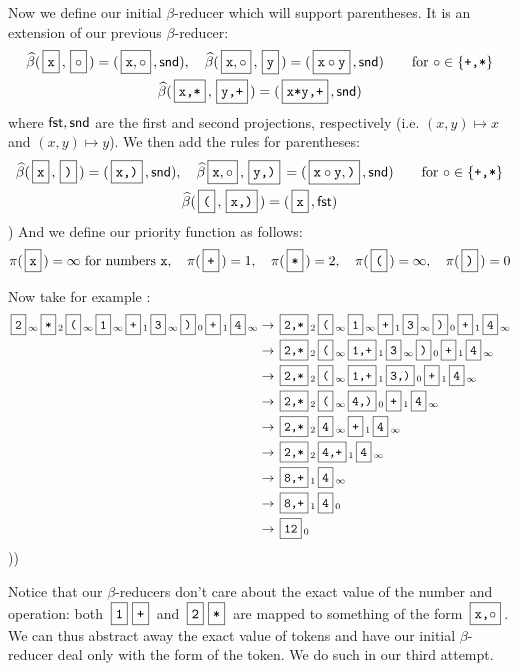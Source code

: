 \documentclass{llncs}
\begin{document}
Now we define our initial $\beta$-reducer which will support parentheses.
It is an extension of our previous $\beta$-reducer:
\begin{gather*}
    \hb(\mbt x,\mb\circ) = (\mb{\ttt x,\circ},\snd),\quad \hb(\mb{\ttt x,\circ},\mbt y) = (\mb{\ttt x\circ\ttt y},\snd) \qquad \hbox{for $\circ\in\set{\ttt{+,*}}$} \\
    \hb(\mbt{x,*},\mbt{y,+}) = (\mbt{x*y,+},\snd)
\end{gather*}
where $\mathsf{fst},\mathsf{snd}$ are the first and second projections, respectively (i.e. $(x,y)\mapsto x$ and $(x,y)\mapsto y$).
We then add the rules for parentheses:
\begin{gather*}
    \hb(\mbt x,\mbt)) = (\mbt{x,)},\snd),\quad \hb{\mb{\ttt x,\circ},\mbt{y,)}} = (\mb{\ttt x\circ\ttt y,\ttt)},\snd) \qquad \hbox{for $\circ\in\set{\ttt{+,*}}$} \\
    \hb(\mbt(,\mbt{x,)}) = (\mbt x,\fst)
\end{gather*}
\gobble) %
And we define our priority function as follows:
\[ \pi(\mbt x) = \infty\hbox{ for numbers \ttt x},\quad \pi(\mbt+) = 1,\quad \pi(\mbt*) = 2,\quad \pi(\mbt() = \infty,\quad \pi(\mbt)) = 0 \]

Now take for example :
\begin{align*}
    \mbt2_\oo \mbt*_2 \mbt(_\oo \mbt1_\oo \mbt+_1 \mbt3_\oo \mbt)_0 \mbt+_1 \mbt4_\oo &\to \mbt{2,*}_2 \mbt(_\oo \mbt1_\oo \mbt+_1 \mbt3_\oo \mbt)_0 \mbt+_1 \mbt4_\oo\\
        &\to \mbt{2,*}_2 \mbt(_\oo \mbt{1,+}_1 \mbt3_\oo \mbt)_0\mbt+_1 \mbt4_\oo\\
        &\to \mbt{2,*}_2 \mbt(_\oo \mbt{1,+}_1 \mbt{3,)}_0 \mbt+_1 \mbt4_\oo\\
        &\to \mbt{2,*}_2 \mbt(_\oo \mbt{4,)}_0 \mbt+_1 \mbt4_\oo\\
        &\to \mbt{2,*}_2 \mbt4_\oo \mbt+_1 \mbt4_\oo\\
        &\to \mbt{2,*}_2 \mbt{4,+}_1 \mbt4_\oo\\
        &\to \mbt{8,+}_1 \mbt4_\oo\\
        &\to \mbt{8,+}_1 \mbt4_0\\
        &\to \mbt{12}_0
\end{align*}
\gobble)\gobble)

Notice that our $\beta$-reducers don't care about the exact value of the number and operation: both $\mbt1\mbt+$ and $\mbt2\mbt*$ are mapped to something of the form $\mbt{x,$\circ$}$.
We can thus abstract away the exact value of tokens and have our initial $\beta$-reducer deal only with the form of the token.
We do such in our third attempt.
\end{document}
